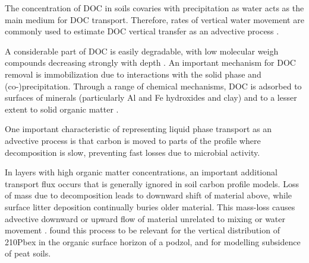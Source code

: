 \documentclass[11pt, oneside, a4paper]{article}   	%
\begin{document}
The concentration of DOC in soils covaries with precipitation \citep{Liu2021} as water acts as the main medium for DOC transport. Therefore, rates of vertical water movement are commonly used to estimate DOC vertical transfer as an advective process \citep{Ota2013}. 

A considerable part of DOC is easily degradable, with low molecular weigh compounds decreasing strongly with depth \citep{Roth2019}.  An important mechanism for DOC removal
is immobilization due to interactions with the solid phase and (co-)precipitation.
Through a range of chemical mechanisms, DOC is adsorbed to surfaces of minerals (particularly Al and Fe hydroxides and clay) and to a lesser extent to solid organic
matter \citep{Neff2001, Kalbitz2008}.

One important characteristic of representing liquid phase transport as an advective process is that carbon is moved to parts of the profile where decomposition is slow, preventing fast losses due to microbial activity. 

In layers with high organic matter concentrations, an important additional transport flux occurs that is generally ignored in soil carbon profile models. Loss of mass due
to decomposition leads to downward shift of material above, while surface litter deposition continually buries older material. This mass-loss causes advective downward or upward flow
of material unrelated to mixing or water movement \citep{Ahrens2015}. \citep{Kaste2007} found this
process to be relevant for the vertical distribution of 210Pbex in the organic surface
horizon of a podzol, and \citet{Hilbert2000} for modelling subsidence of peat soils. 


\end{document}
